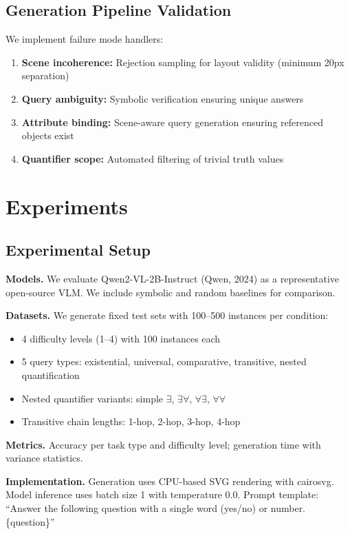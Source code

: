 \documentclass[11pt,a4paper]{article}
\begin{document}
\subsection{Generation Pipeline Validation}

We implement failure mode handlers:

\begin{enumerate}
    \item \textbf{Scene incoherence:} Rejection sampling for layout validity (minimum 20px separation)
    \item \textbf{Query ambiguity:} Symbolic verification ensuring unique answers
    \item \textbf{Attribute binding:} Scene-aware query generation ensuring referenced objects exist
    \item \textbf{Quantifier scope:} Automated filtering of trivial truth values
\end{enumerate}

\section{Experiments}
\label{sec:experiments}

\subsection{Experimental Setup}

\textbf{Models.} We evaluate Qwen2-VL-2B-Instruct (Qwen, 2024) as a representative open-source VLM. We include symbolic and random baselines for comparison.

\textbf{Datasets.} We generate fixed test sets with 100--500 instances per condition:
\begin{itemize}
    \item 4 difficulty levels (1--4) with 100 instances each
    \item 5 query types: existential, universal, comparative, transitive, nested quantification
    \item Nested quantifier variants: simple $\exists$, $\exists\forall$, $\forall\exists$, $\forall\forall$
    \item Transitive chain lengths: 1-hop, 2-hop, 3-hop, 4-hop
\end{itemize}

\textbf{Metrics.} Accuracy per task type and difficulty level; generation time with variance statistics.

\textbf{Implementation.} Generation uses CPU-based SVG rendering with cairosvg. Model inference uses batch size 1 with temperature 0.0. Prompt template: ``Answer the following question with a single word (yes/no) or number. \{question\}''
\end{document}
